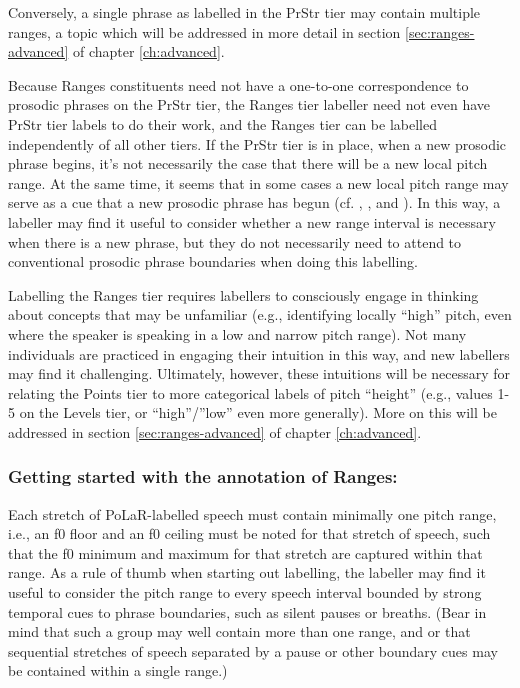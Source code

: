Conversely, a single phrase as labelled in the PrStr tier may contain multiple ranges, a topic which will be addressed in more detail in section \ref{sec:ranges-advanced} of chapter \ref{ch:advanced}.

Because Ranges constituents need not have a one-to-one correspondence to prosodic phrases on the PrStr tier, the Ranges tier labeller need not even have PrStr tier labels to do their work, and the Ranges tier can be labelled independently of all other tiers. If the PrStr tier is in place, when a new prosodic phrase begins, it’s not necessarily the case that there will be a new local pitch range. At the same time, it seems that in some cases a new local pitch range may serve as a cue that a new prosodic phrase has begun (cf. \citealt{brugos15}, \citealt{brugos-18}, and \citealt{kim20}). In this way, a labeller may find it useful to consider whether a new range interval is necessary when there is a new phrase, but they do not necessarily need to attend to conventional prosodic phrase boundaries when doing this labelling.

Labelling the Ranges tier requires labellers to consciously engage in thinking about concepts that may be unfamiliar (e.g., identifying locally “high” pitch, even where the speaker is speaking in a low and narrow pitch range). Not many individuals are practiced in engaging their intuition in this way, and new labellers may find it challenging. Ultimately, however, these intuitions will be necessary for relating the Points tier to more categorical labels of pitch “height” (e.g., values 1-5 on the Levels tier, or “high”\slash ”low” even more generally). More on this will be addressed in section \ref{sec:ranges-advanced} of chapter \ref{ch:advanced}.

\subsubsection{Getting started with the annotation of Ranges:}\label{sec:getting-started-with-the-annotation-of-ranges}

Each stretch of PoLaR-labelled speech must contain minimally one pitch range, i.e., an f0 floor and an f0 ceiling must be noted for that stretch of speech, such that the f0 minimum and maximum for that stretch are captured within that range. As a rule of thumb when starting out labelling, the labeller may find it useful to consider the pitch range to every speech interval bounded by strong temporal cues to phrase boundaries, such as silent pauses or breaths. (Bear in mind that such a group may well contain more than one range, and or that sequential stretches of speech separated by a pause or other boundary cues may be contained within a single range.)

